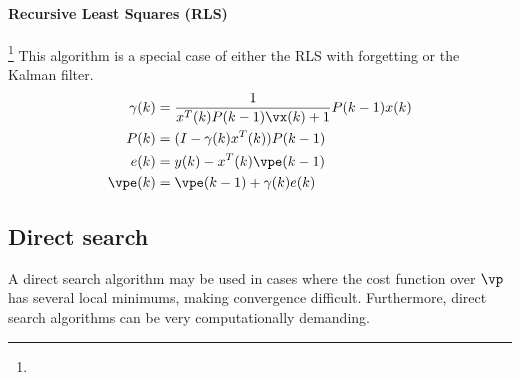 \paragraph{Recursive Least Squares (RLS)}\footnote{}
This algorithm is a special case of either the RLS with forgetting
or the Kalman filter.
\begin{align*}
   \gamma(k) &= \frac{1}{x^T(k)P(k-1)\vx(k)+1}  P(k-1)x(k) \\
   P(k) &= (I-\gamma(k)x^T(k))P(k-1) \\
   e(k) &= y(k) - x^T(k)\vpe(k-1) \\
   \vpe(k) &= \vpe(k-1) + \gamma(k)e(k)
\end{align*}




\subsection{Direct search}
A direct search algorithm may be used in cases where the cost
function over $\vp$ has several local minimums, making convergence difficult.
Furthermore, direct search algorithms can be very computationally demanding.

